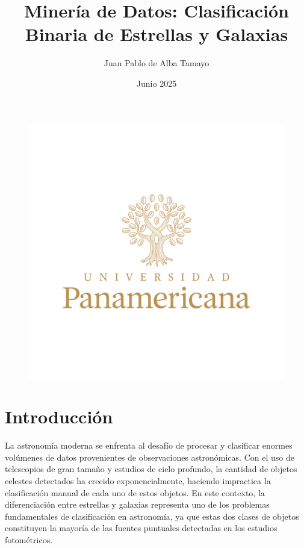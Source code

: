 \documentclass{article}
\title{Minería de Datos: Clasificación Binaria de Estrellas y Galaxias}
\author{Juan Pablo de Alba Tamayo}
\date{Junio 2025}
\begin{document}
\begin{figure}[H]
    \centering
    \includegraphics[width=0.75\linewidth]{logo.png}
\end{figure}

\newpage

\maketitle

\newpage

\tableofcontents

\newpage

\listoffigures

\newpage

\section{Introducción}

La astronomía moderna se enfrenta al desafío de procesar y clasificar enormes volúmenes de datos provenientes de observaciones astronómicas. Con el uso de telescopios de gran tamaño y estudios de cielo profundo, la cantidad de objetos celestes detectados ha crecido exponencialmente, haciendo impractica la clasificación manual de cada uno de estos objetos. En este contexto, la diferenciación entre estrellas y galaxias representa uno de los problemas fundamentales de clasificación en astronomía, ya que estas dos clases de objetos constituyen la mayoría de las fuentes puntuales detectadas en los estudios fotométricos.
\end{document}
